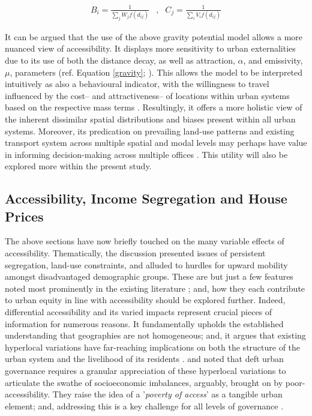 \begin{equation}
\begin{matrix}
B_{i} = \frac{1}{\sum_{j} W_{j} f(d_{ij})} &,& C_{j} = \frac{1}{\sum_{i} V_{i} f(d_{ij})}
\end{matrix}
\label{eqn:balancing_factors}
\end{equation}

It can be argued that the use of the above gravity potential model allows a more nuanced view of accessibility. It displays more sensitivity to urban externalities due to its use of both the distance decay, as well as attraction, $\alpha$, and emissivity, $\mu$, parameters (ref. Equation \ref{gravity}; \cite{wilson1971family,liu2004accessibility}). This allows the model to be interpreted intuitively as also a behavioural indicator, with the willingness to travel influenced by the cost-- and attractiveness-- of locations within urban systems based on the respective mass terms \citep{wilson1971family, miller2018accessibility}. Resultingly, it offers a more holistic view of the inherent dissimilar spatial distributions and biases present within all urban systems. Moreover, its predication on prevailing land-use patterns and existing transport system across multiple spatial and modal levels may perhaps have value in informing decision-making across multiple offices \citep{ewing2002measuring,karou2012accessibility,haynes2020gravity}. This utility will also be explored more within the present study.\\


\subsection{Accessibility, Income Segregation and House Prices}
\label{sec:a_is_hp}

The above sections have now  briefly touched on the many variable effects of accessibility. Thematically, the discussion presented issues of persistent segregation, land-use constraints, and alluded to hurdles for upward mobility amongst disadvantaged demographic groups. These are but just a few features noted most prominently in the existing literature \citep{geurs2004accessibility,ferrer2018sustainable}; and, how they each contribute to urban equity in line with accessibility should be explored further. Indeed, differential accessibility and its varied impacts represent crucial pieces of information for numerous reasons. It fundamentally upholds the established understanding that geographies are not homogeneous; and, it argues that existing hyperlocal variations have far-reaching implications on both the structure of the urban system and the livelihood of its residents \citep{curl2011does}. \cite{banister2005unsustainable} and \cite{farrington2007new} noted that deft urban governance requires a granular appreciation of these hyperlocal variations to articulate the swathe of socioeconomic imbalances, arguably, brought on by poor-accessibility. They raise the idea of a '\textit{poverty of access}' as a tangible urban element; and, addressing this is a key challenge for all levels of governance \cite[p.324]{farrington2007new}.\\

